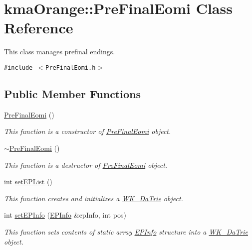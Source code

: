 \hypertarget{classkmaOrange_1_1PreFinalEomi}{
\section{kmaOrange::PreFinalEomi Class Reference}
\label{classkmaOrange_1_1PreFinalEomi}
}
This class manages prefinal endings.  


{\tt \#include $<$PreFinalEomi.h$>$}

\subsection*{Public Member Functions}
\begin{CompactItemize}
\item 
\hyperlink{classkmaOrange_1_1PreFinalEomi_de1edac505a8ddb81a6de1b20c6bf338}{PreFinalEomi} ()
\begin{CompactList}\small\item\em This function is a constructor of \hyperlink{classkmaOrange_1_1PreFinalEomi}{PreFinalEomi} object. \item\end{CompactList}\item 
\hyperlink{classkmaOrange_1_1PreFinalEomi_1c821b7b617615e3849849509198d98e}{$\sim$PreFinalEomi} ()
\begin{CompactList}\small\item\em This function is a destructor of \hyperlink{classkmaOrange_1_1PreFinalEomi}{PreFinalEomi} object. \item\end{CompactList}\item 
int \hyperlink{classkmaOrange_1_1PreFinalEomi_02183bcf01f69f0f246a9c6311df4447}{setEPList} ()
\begin{CompactList}\small\item\em This function creates and initializes a \hyperlink{classkmaOrange_1_1WK__DaTrie}{WK\_\-DaTrie} object. \item\end{CompactList}\item 
int \hyperlink{classkmaOrange_1_1PreFinalEomi_02b86bb7101056a9a006404beac50543}{setEPInfo} (\hyperlink{structkmaOrange_1_1EPInfo}{EPInfo} \&epInfo, int pos)
\begin{CompactList}\small\item\em This function sets contents of static array \hyperlink{structkmaOrange_1_1EPInfo}{EPInfo} structure into a \hyperlink{classkmaOrange_1_1WK__DaTrie}{WK\_\-DaTrie} object. \item\end{CompactList}\item 

\end{CompactItemize}
